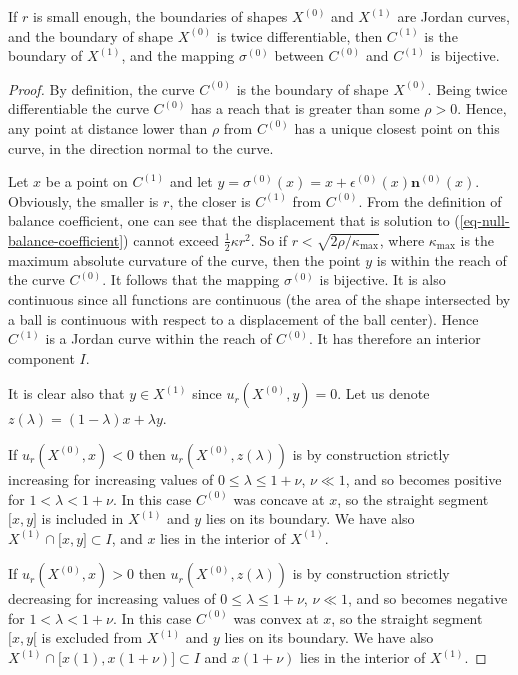 \documentclass[smallextended]{svjour3}
\newcommand{\Equ}[1]{(\ref{#1})}
\begin{document}
\begin{proposition} \label{prop-C-equ-X}
  If $r$ is small enough, the boundaries of shapes $X^{(0)}$ and
  $X^{(1)}$ are Jordan curves, and the boundary of shape $X^{(0)}$ is
  twice differentiable, then $C^{(1)}$ is the boundary of $X^{(1)}$,
  and the mapping $\sigma^{(0)}$ between $C^{(0)}$ and $C^{(1)}$ is
  bijective.
\end{proposition}
\begin{proof}
  By definition, the curve $C^{(0)}$ is the boundary of shape
  $X^{(0)}$. 
  Being twice differentiable the curve $C^{(0)}$ has a reach that is
  greater than some $\rho > 0$. Hence, any point at distance lower
  than $\rho$ from $C^{(0)}$ has a unique closest point on this
  curve, in the direction normal to the curve.

  Let $x$ be a point on $C^{(1)}$ and let
  $y=\sigma^{(0)}(x)=x+\epsilon^{(0)}(x) \mathbf{n}^{(0)}(x)$.
  Obviously, the smaller is $r$, the closer is $C^{(1)}$ from
  $C^{(0)}$.  From the definition of balance coefficient, one can see
  that the displacement that is solution to
  \Equ{eq-null-balance-coefficient} cannot exceed $\frac{1}{2}\kappa
  r^2$. So if $r < \sqrt{2\rho / \kappa_{\max}}$, where
  $\kappa_{\max}$ is the maximum absolute curvature of the curve, then
  the point $y$ is within the reach of the curve $C^{(0)}$. It follows
  that the mapping $\sigma^{(0)}$ is bijective. It is also continuous
  since all functions are continuous (the area of the shape
  intersected by a ball is continuous with respect to a displacement
  of the ball center).  Hence $C^{(1)}$ is a Jordan curve within the
  reach of $C^{(0)}$. It has therefore an interior component $I$.

  It is clear also that $y \in X^{(1)}$ since $u_r(X^{(0)},y)=0$.
  Let us denote $z(\lambda)=(1-\lambda)x+\lambda y$.

  If $u_r(X^{(0)},x)<0$ then $u_r(X^{(0)},z(\lambda))$ is by
  construction strictly increasing for increasing values of $0 \le
  \lambda \le 1+\nu$, $\nu \ll 1$, and so becomes positive for
  $1<\lambda < 1 + \nu$. In this case $C^{(0)}$ was concave at $x$,
  so the straight segment $\lbrack x,y \rbrack$ is included in
  $X^{(1)}$ and $y$ lies on its boundary. We have also $X^{(1)}
  \cap \lbrack x,y \rbrack \subset I$, and $x$ lies in the interior of
  $X^{(1)}$.
  
  If $u_r(X^{(0)},x)>0$ then $u_r(X^{(0)},z(\lambda))$ is by
  construction strictly decreasing for increasing values of $0 \le
  \lambda \le 1+\nu$, $\nu \ll 1$, and so becomes negative for
  $1<\lambda < 1 + \nu$.  In this case $C^{(0)}$ was convex at $x$,
  so the straight segment $\lbrack x,y \lbrack$ is excluded from
  $X^{(1)}$ and $y$ lies on its boundary. We have also $X^{(1)}
  \cap \lbrack x(1),x(1+\nu) \rbrack \subset I$ and $x(1+\nu)$ lies in
  the interior of $X^{(1)}$.


\end{proof}
\end{document}
